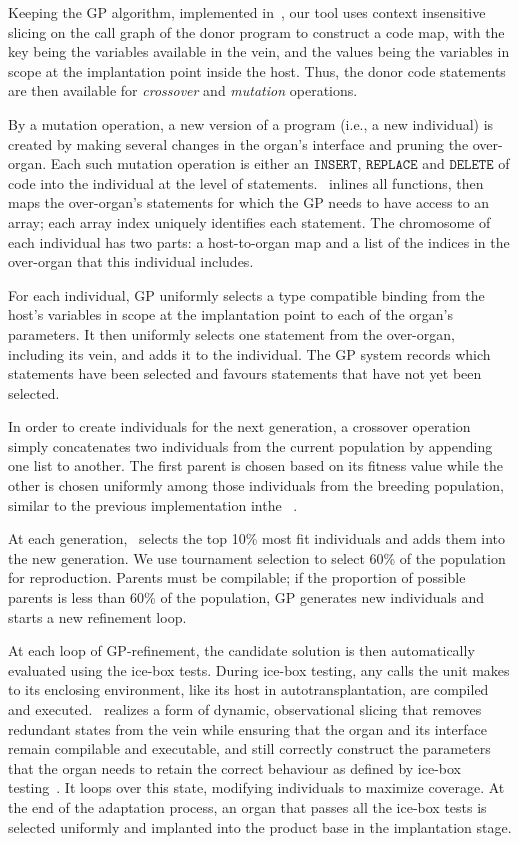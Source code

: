 Keeping the GP algorithm, implemented in~\cite{Barr2015}, our tool uses context insensitive slicing on the call graph of the donor program to construct a code map, with the key being the variables available in the vein, and the values being the variables in scope at the implantation point inside the host. Thus, the donor code statements are then available for \emph{crossover} and \emph{mutation} operations. 

By a mutation operation, a new version of a program (i.e., a new individual) is created by making several changes in the organ's interface and pruning the over-organ. Each such mutation operation is either an $\texttt{INSERT}$, $\texttt{REPLACE}$ and $\texttt{DELETE}$ of code into the individual at the level of statements. \autoscalpel~inlines all functions, then maps the over-organ's statements for which the GP needs to have access to an array; each array index uniquely identifies each statement. The chromosome of each individual has two parts: a host-to-organ map and a list of the indices in the over-organ that this individual includes. 

For each individual, GP uniformly selects a type compatible binding from the host's variables in scope at the implantation point to each of the organ's parameters. It then uniformly selects one statement from the over-organ, including its vein, and adds it to the individual. The GP system records which statements have been selected and favours statements that have not yet been selected.

In order to create individuals for the next generation, a crossover operation simply concatenates two individuals from the current population by appending one list to another. The first parent is chosen based on its fitness value while the other is chosen uniformly among those individuals from the breeding population, similar to the previous implementation inthe ~\cite{Petke2014}.

At each generation, \autoscalpel~selects the top 10\% most fit individuals and adds them into the new generation. We use tournament selection to select 60\% of the population for reproduction. Parents must be compilable; if the proportion of possible parents is less than 60\% of the population, GP generates new individuals and starts a new refinement loop. 

At each loop of GP-refinement, the candidate solution is then automatically evaluated using the ice-box tests. During ice-box testing, any calls the unit makes to its enclosing environment, like its host in autotransplantation, are compiled and executed. \autoscalpel~realizes a form of dynamic, observational slicing that removes redundant states from the vein while ensuring that the organ and its interface remain compilable and executable, and still correctly construct the parameters that the organ needs to retain the correct behaviour as defined by ice-box testing~\cite{Barr2015}. It loops over this state, modifying individuals to maximize coverage. At the end of the adaptation process, an organ that passes all the ice-box tests is selected uniformly and implanted into the product base in the implantation stage.

